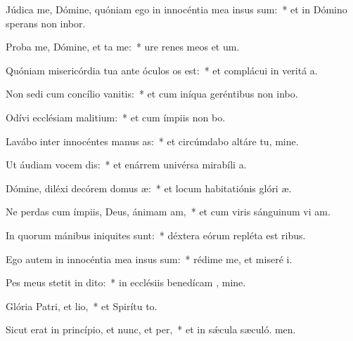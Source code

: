 \item Júdica me, Dómine, quóniam ego in innocéntia mea insus sum:~* et in Dómino sperans non inbor.
\item Proba me, Dómine, et ta me:~* ure renes meos et  um.
\item Quóniam misericórdia tua ante óculos os est:~* et complácui in veritá a.
\item Non sedi cum concílio vanitis:~* et cum iníqua geréntibus non inbo.
\item Odívi ecclésiam malitium:~* et cum ímpiis non bo.
\item Lavábo inter innocéntes manus as:~* et circúmdabo altáre tu, mine.
\item Ut áudiam vocem dis:~* et enárrem univérsa mirabíli a.
\item Dómine, diléxi decórem domus æ:~* et locum habitatiónis glóri æ.
\item Ne perdas cum ímpiis, Deus, ánimam am,~* et cum viris sánguinum vi am.
\item In quorum mánibus iniquites sunt:~* déxtera eórum repléta est ribus.
\item Ego autem in innocéntia mea insus sum:~* rédime me, et miseré i.
\item Pes meus stetit in dito:~* in ecclésiis benedícam , mine.
\item Glória Patri, et lio,~* et Spirítu to.
\item Sicut erat in princípio, et nunc, et per,~* et in sǽcula sæculó. men.
